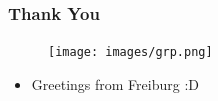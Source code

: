 \documentclass{beamer}
\newcommand{\red}[1]{\textcolor{red}{#1}}
\begin{document}
\begin{frame}
    \frametitle{Thank You}
    
    \begin{figure}[ht]
        \centering
        \texttt{[image: images/grp.png]}
    \end{figure}
    
    \begin{itemize}
        \item  Greetings from Freiburg :D
    \end{itemize}
\end{frame}


%
\end{document}
